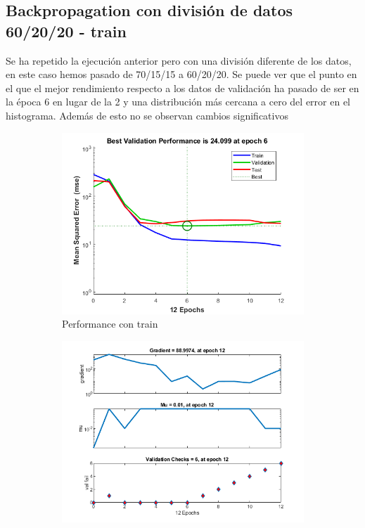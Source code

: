 \documentclass[a4paper, 12pt]{article}
\begin{document}
            \newpage
            \subsection{Backpropagation con división de datos 60/20/20 - train}
                Se ha repetido la ejecución anterior pero con una división diferente de los datos, en este caso hemos pasado de 70/15/15 a 60/20/20. Se puede ver que el punto en el que el mejor rendimiento respecto a los datos de validación ha pasado de ser en la época 6 en lugar de la 2 y una distribución más cercana a cero del error en el histograma. Además de esto no se observan cambios significativos
                \begin{figure}[htp!]
                    \caption{Gráficas con Backpropagation con división 60/20/20}
                    \begin{subfigure}{0.49\textwidth}
                        \centering
        		      \includegraphics[width=\textwidth]{figures/parte1/Ej3/Ej3_performance_train_60.png}
                        \caption{Performance con train}
                    \end{subfigure}
                    \begin{subfigure}{0.49\textwidth}
                        \includegraphics[width=\textwidth]{figures/parte1/Ej3/Ej3_training_state_train_60.png}

\end{subfigure}
\end{figure}
\end{document}
